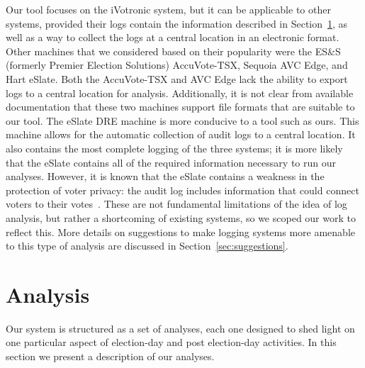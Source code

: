 \documentclass[letterpaper,twocolumn,10pt]{article}
\begin{document}
Our tool focuses on the iVotronic system, but it can be applicable to other systems, provided their logs contain 
the information described in Section~\ref{sec:analysis}, as well as a way to collect the logs at a central 
location in an electronic format. Other machines that we considered based on their popularity were the ES\&S (formerly 
Premier Election Solutions) AccuVote-TSX, Sequoia AVC Edge, and Hart eSlate. Both the 
AccuVote-TSX and AVC Edge lack the ability to export logs to a central location for analysis. 
Additionally, it is not clear from available documentation that these two machines support 
file formats that are suitable to our tool. The eSlate DRE machine is more conducive to 
a tool such as ours. This machine allows for the automatic collection of audit logs to a 
central location. It also contains the most complete logging of the three systems; it is 
more likely that the eSlate contains all of the required information necessary to run our 
analyses.  
 However, it is known that the 
eSlate contains a weakness in the protection of voter privacy: the audit log includes information 
that could connect voters to their votes~\cite{Wagner2010}. 
 These are not fundamental limitations 
of the idea of log analysis, but rather a shortcoming of existing systems, so we scoped our work 
to reflect this. More details on suggestions to make logging systems more
amenable to this type of analysis are discussed in Section~\ref{sec:suggestions}.



\section{Analysis}
\label{sec:analysis}
Our system is structured as a set of analyses, each one designed to shed light
on one particular aspect of election-day and post election-day activities. In
this section we present a description of our analyses.
\end{document}
